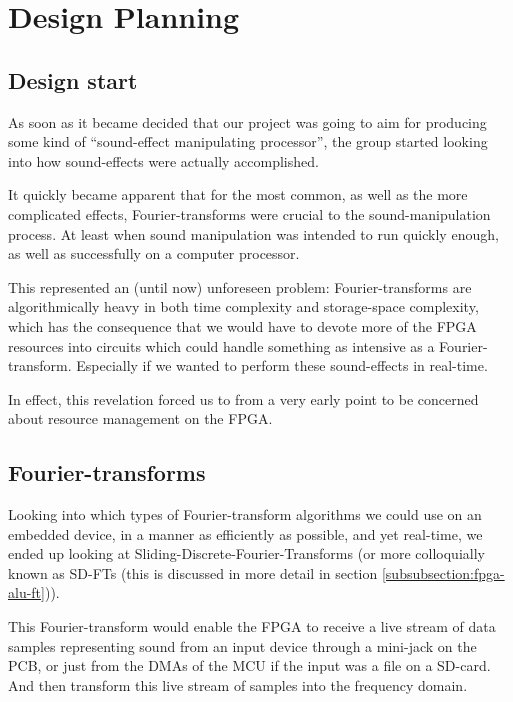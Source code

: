 \FloatBarrier
\section{Design Planning}\label{section:fpga-design}
\subsection{Design start}

As soon as it became decided that our project was going to aim for producing
some kind of ``sound-effect manipulating processor'', the group started looking
into how sound-effects were actually accomplished.

It quickly became apparent that for the most common, as well as the more
complicated effects, Fourier-transforms were crucial to the sound-manipulation
process. At least when sound manipulation was intended to run quickly enough,
as well as successfully on a computer processor.

This represented an (until now) unforeseen problem: Fourier-transforms are
algorithmically heavy in both time complexity and storage-space complexity,
which has the consequence that we would have to devote more of the FPGA
resources into circuits which could handle something as intensive as a
Fourier-transform. Especially if we wanted to perform these sound-effects in
real-time.

In effect, this revelation forced us to from a very early point to be
concerned about resource management on the FPGA.

\subsection{Fourier-transforms}\label{subsection:fpga-design-ft}

Looking into which types of Fourier-transform algorithms we could use on an
embedded device, in a manner as efficiently as possible, and yet real-time,
we ended up looking at Sliding-Discrete-Fourier-Transforms\cite{SD-FT} (or more
colloquially known as SD-FTs (this is discussed in more detail in
section \ref{subsubsection:fpga-alu-ft})).

This Fourier-transform would enable the FPGA to receive a live stream of
data samples representing sound from an input device through a mini-jack on the
PCB, or just from the DMAs of the MCU if the input was a file on a SD-card. And
then transform this live stream of samples into the frequency domain.

